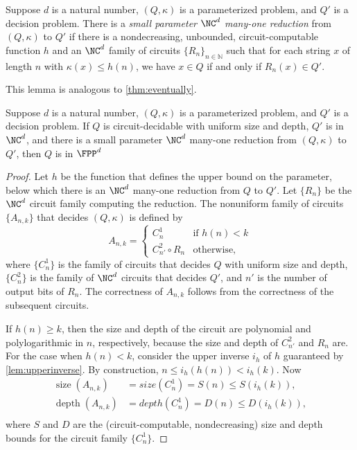 \documentclass{article}
\DeclareMathOperator{\depth}{depth}
\DeclareMathOperator{\size}{size}
\begin{document}
\begin{definition}\label{def:spreduction}
  Suppose $d$ is a natural number, $(Q, \kappa)$ is a parameterized problem, and $Q'$ is a decision problem.
  There is a \emph{small parameter $\NC^d$ many-one reduction} from $(Q, \kappa)$ to $Q'$ if there is a nondecreasing, unbounded, circuit-computable function $h$ and an $\NC^d$ family of circuits $\{R_n\}_{n \in \mathbb{N}}$ such that for each string $x$ of length $n$ with $\kappa(x) \leq h(n)$, we have $x \in Q$ if and only if $R_n(x) \in Q'$.
\end{definition}

This lemma is analogous to \autoref{thm:eventually}.

\begin{lemma}\label{lem:spreduction}
  Suppose $d$ is a natural number, $(Q, \kappa)$ is a parameterized problem, and $Q'$ is a decision problem.
  If $Q$ is circuit-decidable with uniform size and depth, $Q'$ is in $\NC^d$, and there is a small parameter $\NC^d$ many-one reduction from $(Q, \kappa)$ to $Q'$, then $Q$ is in $\FPP^d$
\end{lemma}
\begin{proof}
  Let $h$ be the function that defines the upper bound on the parameter, below which there is an $\NC^d$ many-one reduction from $Q$ to $Q'$.
  Let $\{R_n\}$ be the $\NC^d$ circuit family computing the reduction.
  The nonuniform family of circuits $\{A_{n, k}\}$ that decides $(Q, \kappa)$ is defined by
  \[
  A_{n, k} =
  \begin{cases}
    C_n^1 & \text{if } h(n) < k \\
    C_{n'}^2 \circ R_{n} & \text{otherwise},
  \end{cases}
  \]
  where $\{C_n^1\}$ is the family of circuits that decides $Q$ with uniform size and depth, $\{C_n^2\}$ is the family of $\NC^d$ circuits that decides $Q'$, and $n'$ is the number of output bits of $R_n$.
  The correctness of $A_{n, k}$ follows from the correctness of the subsequent circuits.

  If $h(n) \geq k$, then the size and depth of the circuit are polynomial and polylogarithmic in $n$, respectively, because the size and depth of $C_{n'}^2$ and $R_n$ are.
  For the case when $h(n) < k$, consider the upper inverse $i_h$ of $h$ guaranteed by \autoref{lem:upperinverse}.
  By construction, $n \leq i_h(h(n)) < i_h(k)$.
  Now
  \begin{align*}
    \size(A_{n, k}) & = size(C_n^1) = S(n) \leq S(i_h(k)), \\
    \depth(A_{n, k}) & = depth(C_n^1) = D(n) \leq D(i_h(k)), \\
  \end{align*}
  where $S$ and $D$ are the (circuit-computable, nondecreasing) size and depth bounds for the circuit family $\{C_n^1\}$.
\end{proof}
\end{document}
